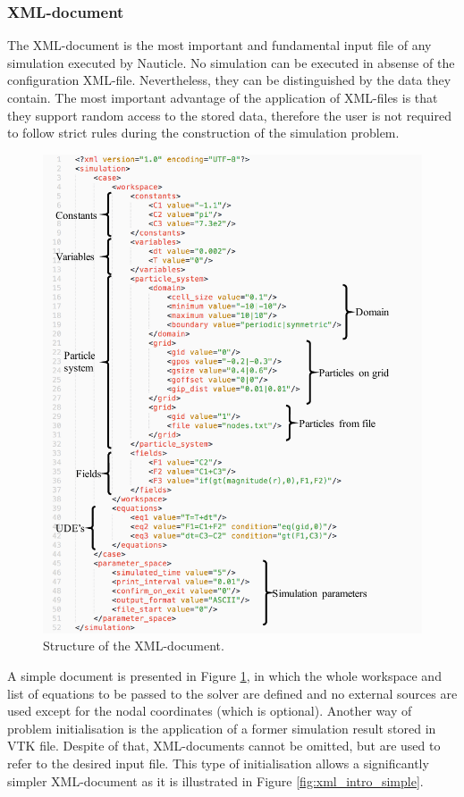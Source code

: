 \documentclass[a4paper,12pt,openany]{book}
\theoremstyle{break}
\begin{document}
\subsubsection{XML-document} \label{sec:XML}
The XML-document is the most important and fundamental input file of any simulation executed by Nauticle. No simulation can be executed in absense of the configuration XML-file. Nevertheless, they can be distinguished by the data they contain. The most important advantage of the application of XML-files is that they support random access to the stored data, therefore the user is not required to follow strict rules during the construction of the simulation problem.
\begin{figure}[h!]
  \includegraphics[scale=1.05]{xml_intro.pdf}
  \centering
  \caption{Structure of the XML-document.}
  \label{fig:xml_intro}
\end{figure}\vspace*{3pt}
A simple document is presented in Figure \ref{fig:xml_intro}, in which the whole workspace and list of equations to be passed to the solver are defined and no external sources are used except for the nodal coordinates (which is optional). Another way of problem initialisation is the application of a former simulation result stored in VTK file. Despite of that, XML-documents cannot be omitted, but are used to refer to the desired input file. This type of initialisation allows a significantly simpler XML-document as it is illustrated in Figure \ref{fig:xml_intro_simple}.
\end{document}

